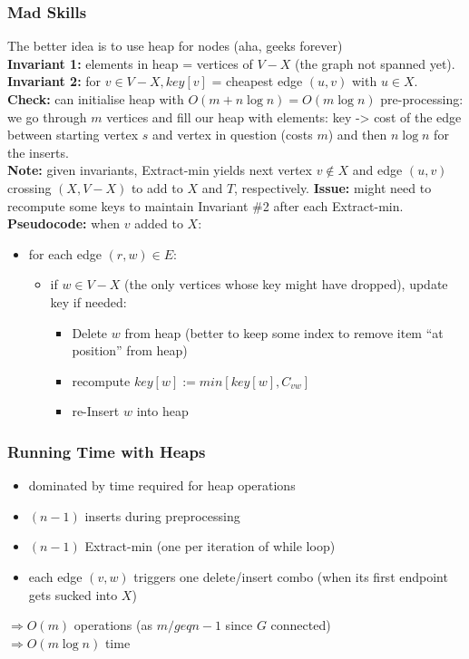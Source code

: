 \documentclass{scrartcl}
\begin{document}
\subsubsection{Mad Skills}
\label{sec:5-6-1}
The better idea is to use heap for nodes (aha, geeks forever)\\
{\bf Invariant 1: } elements in heap = vertices of $V - X$ (the graph not
spanned yet).\\
{\bf Invariant 2: } for $v \in V-X, key[v]$ = cheapest edge $(u, v)$ with $u
\in X$.\\
{\bf Check: } can initialise heap with $O(m + n \log n)= O(m \log n)$
pre-processing: we go through $m$ vertices and fill our heap with elements: key
-> cost of the edge between starting vertex $s$ and vertex in question
(costs $m$) and then $n \log n$ for the inserts.\\
{\bf Note: } given invariants, Extract-min yields next vertex $v \notin X$ and
edge $(u, v)$ crossing $(X, V-X)$ to add to $X$ and $T$, respectively.
{\bf Issue: } might need to recompute some keys to maintain Invariant \#2 after
each Extract-min.\\
{\bf Pseudocode: } when $v$ added to $X$:
\begin{itemize}
\item for each edge $(r, w) \in E$:
  \begin{itemize}
  \item if $w \in V-X$ (the only vertices whose key might have dropped), update
    key if needed:
    \begin{itemize}
    \item Delete $w$ from heap (better to keep some index to remove item ``at
      position'' from heap)
    \item recompute $key[w] := min[key[w], C_{vw}]$
    \item re-Insert $w$ into heap
    \end{itemize}
  \end{itemize}
\end{itemize}

\subsubsection{Running Time with Heaps}
\label{sec:5-7-1}
\begin{itemize}
\item dominated by time required for heap operations
\item $(n-1)$ inserts during preprocessing
\item $(n-1)$ Extract-min (one per iteration of while loop)
\item each edge $(v, w)$ triggers one delete/insert combo (when its first
  endpoint gets sucked into $X$)\\
\end{itemize}
$\Rightarrow O(m)$ operations (as $m /geq n -1$  since $G$ connected)\\
$\Rightarrow O(m \log n)$ time \\
\end{document}
